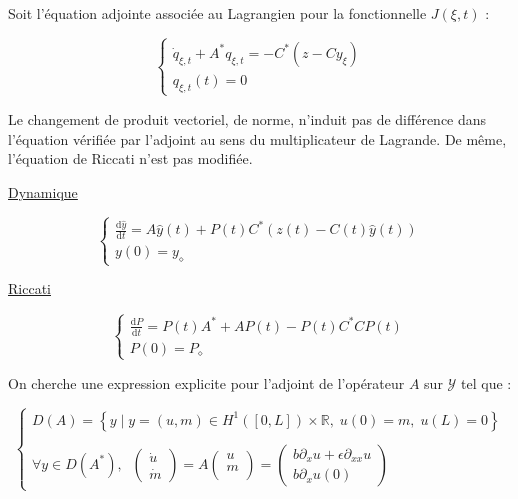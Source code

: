 \documentclass[a4paper]{article}
\newcommand{\dep}{b}
\begin{document}
Soit l'équation adjointe associée au Lagrangien pour la fonctionnelle $J(\xi,t)$ :

\begin{equation}
	\label{cas2:adjoint}
	\begin{cases}
	\dot{q}_{\xi,t} + A^* q_{\xi,t} = - C^*(z-Cy_{\xi}) \\
	q_{\xi,t}(t) =0
	\end{cases}
\end{equation}

\begin{remarque}
	Le changement de produit vectoriel, de norme, 
	n'induit pas de différence dans l'équation vérifiée par l'adjoint
	au sens du multiplicateur de Lagrande.
	De même, l'équation de Riccati n'est pas modifiée.
\end{remarque}

\vspace{0.3cm}

\underline{Dynamique}

\begin{equation}
	\begin{cases}
    \displaystyle \frac{\mathrm{d} \hat{y}}{\mathrm{d}t} = A \hat{y}(t) + P(t) C^* (z(t) - C(t)\hat{y}(t)) \\
    y(0) = y_{\diamond}
     \end{cases}	
\end{equation}

\underline{Riccati}

\begin{equation}
	\begin{cases}
    \displaystyle \frac{\mathrm{d} P}{\mathrm{d}t} = P(t)A^* + AP(t) - P(t) C^* CP(t) \\
    P(0) = P_{\diamond}
     \end{cases}	
\end{equation}


\vspace{0.3cm}
On cherche une expression explicite pour
l'adjoint de l'opérateur $A$ sur $\mathscr{Y}$ tel que :

\begin{equation}
	\begin{cases}
		D(A) = \left\{ y \; | \; y = (u,m) \in H^1([0,L])\times \mathbb{R},
 \; u(0)=m, \; u(L)=0 \right\} \\
        \\
        \forall y \in D(A^*), \; \;
		\left( \begin{array}{c}
		\dot{u}\\
		\dot{m}
		\end{array} \right)
		= A \left( \begin{array}{c}
		u\\
		m\\
		\end{array} \right) 
		= \left(\begin{array}{c}
		\dep \partial_x u + \epsilon \partial_{xx} u\\
		\dep \partial_x u(0)
		\end{array}\right)
	\end{cases}
\end{equation}
\end{document}
